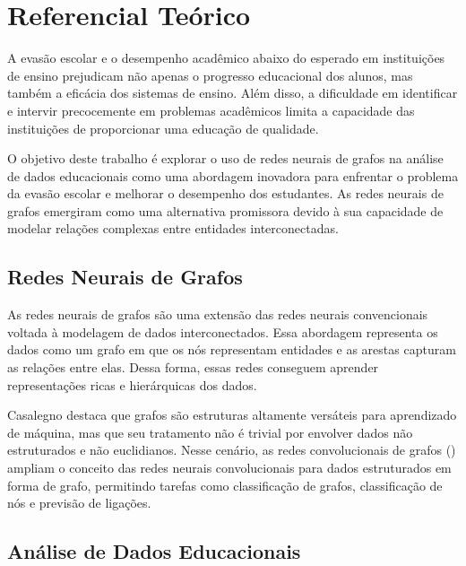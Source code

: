 \chapter{Referencial Te\'orico}
\label{pre:referencial}

A evas\~ao escolar e o desempenho acad\^emico abaixo do esperado em institui\c{c}\~oes de ensino prejudicam n\~ao apenas o progresso educacional dos alunos, mas tamb\'em a efic\'acia dos sistemas de ensino. Al\'em disso, a dificuldade em identificar e intervir precocemente em problemas acad\^emicos limita a capacidade das institui\c{c}\~oes de proporcionar uma educa\c{c}\~ao de qualidade.

O objetivo deste trabalho \'e explorar o uso de redes neurais de grafos na an\'alise de dados educacionais como uma abordagem inovadora para enfrentar o problema da evas\~ao escolar e melhorar o desempenho dos estudantes. As redes neurais de grafos emergiram como uma alternativa promissora devido \`a sua capacidade de modelar rela\c{c}\~oes complexas entre entidades interconectadas.

\section{Redes Neurais de Grafos}
\label{pre:rng}

As redes neurais de grafos s\~ao uma extens\~ao das redes neurais convencionais voltada \`a modelagem de dados interconectados. Essa abordagem representa os dados como um grafo em que os n\'os representam entidades e as arestas capturam as rela\c{c}\~oes entre elas. Dessa forma, essas redes conseguem aprender representa\c{c}\~oes ricas e hier\'arquicas dos dados.

Casalegno \cite{casalegno2021} destaca que grafos s\~ao estruturas altamente vers\'ateis para aprendizado de m\'aquina, mas que seu tratamento n\~ao \'e trivial por envolver dados n\~ao estruturados e n\~ao euclidianos. Nesse cen\'ario, as redes convolucionais de grafos () ampliam o conceito das redes neurais convolucionais para dados estruturados em forma de grafo, permitindo tarefas como classifica\c{c}\~ao de grafos, classifica\c{c}\~ao de n\'os e previs\~ao de liga\c{c}\~oes.

\section{An\'alise de Dados Educacionais}
\label{pre:analise}

